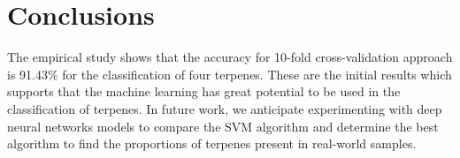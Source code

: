 \documentclass[12pt, a4paper]{article}
\begin{document}
\section{Conclusions}
The empirical study shows that the accuracy for 10-fold cross-validation approach is 91.43\% for the classification of four terpenes. These are the initial results which supports that the machine learning has great potential to be used in the classification of terpenes. In future work, we anticipate experimenting with deep neural networks models to compare the SVM algorithm \cite{Cortes1995} and determine the best algorithm to find the proportions of terpenes present in real-world samples.


\newpage
 



 
\clearpage




\printglossary[nonumberlist]
 
\end{document}

